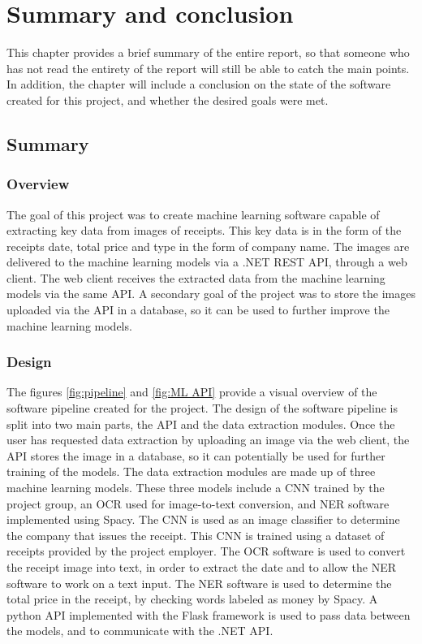 \chapter{Summary and conclusion}
\label{ch:summaryandconclusion}
This chapter provides a brief summary of the entire report, so that someone who has not read the entirety of the report will still be able to catch the main points.
In addition, the chapter will include a conclusion on the state of the software created for this project, and whether the desired goals were met.

\section{Summary}\label{summary}
\subsection{Overview}\label{overview}
The goal of this project was to create machine learning software capable of extracting key data from images of receipts.
This key data is in the form of the receipts date, total price and type in the form of company name.
The images are delivered to the machine learning models via a .NET REST API, through a web client.
The web client receives the extracted data from the machine learning models via the same API.
A secondary goal of the project was to store the images uploaded via the API in a database, so it can be used to further improve the machine learning models.

\subsection{Design}\label{design}
The figures \ref{fig:pipeline} and \ref{fig:ML API} provide a visual overview of the software pipeline created for the project.
The design of the software pipeline is split into two main parts, the API and the data extraction modules.
Once the user has requested data extraction by uploading an image via the web client, the API stores the image in a database, so it can potentially be used for further training of the models.
The data extraction modules are made up of three machine learning models.
These three models include a CNN trained by the project group, an OCR used for image-to-text conversion, and NER software implemented using Spacy.
The CNN is used as an image classifier to determine the company that issues the receipt.
This CNN is trained using a dataset of receipts provided by the project employer.
The OCR software is used to convert the receipt image into text, in order to extract the date and to allow the NER software to work on a text input.
The NER software is used to determine the total price in the receipt, by checking words labeled as money by Spacy.
A python API implemented with the Flask framework is used to pass data between the models, and to communicate with the .NET API.

